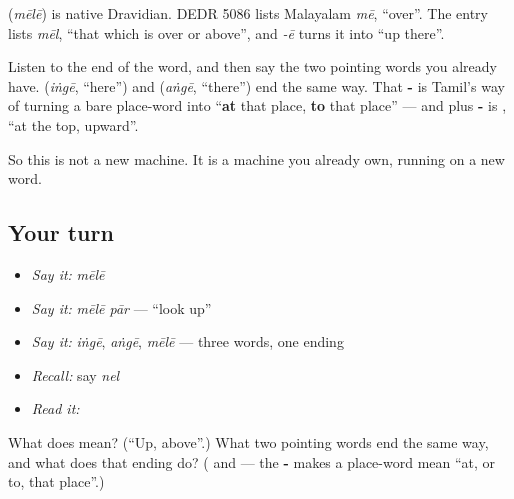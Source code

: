 \begin{cousinweb}
\textbf{} (\emph{mēlē}) is native Dravidian. DEDR 5086 lists Malayalam \emph{mē}, \textquotedblleft{}over\textquotedblright{}. The entry lists \emph{mēl}, \textquotedblleft{}that which is over or above\textquotedblright{}, and \emph{-ē} turns it into \textquotedblleft{}up there\textquotedblright{}.
\end{cousinweb}

\begin{culture}
Listen to the end of the word, and then say the two pointing words you already have. \textbf{} (\emph{iṅgē}, \textquotedblleft{}here\textquotedblright{}) and \textbf{} (\emph{aṅgē}, \textquotedblleft{}there\textquotedblright{}) end the same way. That \textbf{-} is Tamil's way of turning a bare place-word into \textquotedblleft{}\textbf{at} that place, \textbf{to} that place\textquotedblright{} — and \textbf{} plus \textbf{-} is \textbf{}, \textquotedblleft{}at the top, upward\textquotedblright{}.

So this is not a new machine. It is a machine you already own, running on a new word.
\end{culture}

\subsection*{Your turn}
\begin{itemize}
\raggedright
  \item \emph{Say it:} \emph{mēlē}
  \item \emph{Say it:} \emph{mēlē pār} — \textquotedblleft{}look up\textquotedblright{}
  \item \emph{Say it:} \emph{iṅgē}, \emph{aṅgē}, \emph{mēlē} — three words, one ending
  \item \emph{Recall:} say \emph{nel}
  \item \emph{Read it:} \textbf{}
\end{itemize}

\begin{tcolorbox}[breakable,colback=teal!4,colframe=teal!35!black,title={Before you move on}]
What does  mean? (\textquotedblleft{}Up, above\textquotedblright{}.) What two pointing words end the same way, and what does that ending do? (\textbf{} and \textbf{} — the \textbf{-} makes a place-word mean \textquotedblleft{}at, or to, that place\textquotedblright{}.)
\end{tcolorbox}
